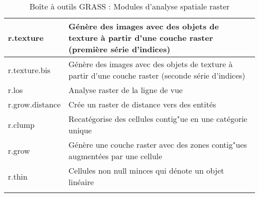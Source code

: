\begin{center}
{\begin{longtable}{|p{2.5cm}|p{11.5cm}|}
  \hline r.texture & Génère des images avec des objets de texture à partir d'une couche raster (première série d'indices)\\
  \hline r.texture.bis & Génère des images avec des objets de texture à partir d'une couche raster (seconde série d'indices)\\
  \hline r.los & Analyse raster de la ligne de vue\\
  \hline r.grow.distance & Crée un raster de distance vers des entités \\
  \hline r.clump & Recatégorise des cellules contig"ue en une catégorie unique \\
  \hline r.grow & Génère une couche raster avec des zones contig"ues augmentées par une cellule\\
  \hline r.thin & Cellules non null minces qui dénote un objet linéaire \\
\hline
\caption{Boîte à outils GRASS : Modules d'analyse spatiale raster}
\end{longtable}}
\end{center} 

